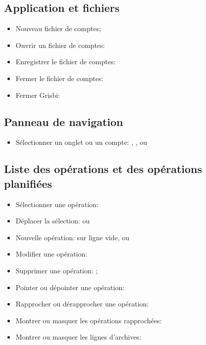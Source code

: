 \subsection{Application et fichiers}

\begin{itemize}
	\item Nouveau fichier de comptes; 
	\item Ouvrir un fichier de comptes: 
	\item Enregistrer le fichier de comptes: 
	\item Fermer le fichier de comptes: 
	\item Fermer Grisbi: 
\end{itemize}


\subsection{Panneau de navigation}

\begin{itemize}
	\item Sélectionner un onglet ou un compte: , ,  ou 
\end{itemize}


\subsection{Liste des opérations et des opérations planifiées}

\begin{itemize}
	\item Sélectionner une opération: 
	\item Déplacer la sélection:  ou 
	\item Nouvelle opération:  sur ligne vide, ou 
	\item Modifier une opération: 
	\item Supprimer une opération: ;
	\item Pointer ou dépointer une opération: 
	\item Rapprocher ou dérapprocher une opération: 
	\item Montrer ou masquer les opérations rapprochées: 
	\item Montrer ou masquer les lignes d'archives: 
\end{itemize}



